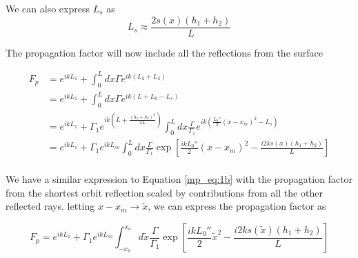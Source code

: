 We can also express $L_s$ as
\begin{equation}
L_s \approx \frac{2s(x)(h_1 + h_2)}{L}
\label{mp_eq:19}
\end{equation}

The propagation factor will now include all the reflections from the surface

\begin{equation}
\begin{aligned}
F_p &= e^{ikL_1} + \int_0^Ldx\Gamma  e^{ik(L_2+L_3)}\\
&= e^{ikL_1} + \int_0^Ldx\Gamma  e^{ik(L+L_0-L_s)}\\
&= e^{ikL_1} +  \Gamma_1e^{ik(L+\frac{(h_1+h_2)^2}{2L})}\int_0^Ldx\frac{\Gamma}{\Gamma_1} e^{ik(\frac{L_0''}{2}(x-x_m)^2-L_s)}\\
&= e^{ikL_1} + \Gamma_1e^{ikL_{so}}\int_0^Ldx\frac{\Gamma}{\Gamma_1} \exp\left[\frac{ikL_0''}{2}(x-x_m)^2 - \frac{i2ks(x)(h_1+h_2)}{L}\right]\\
\end{aligned}
\label{mp_eq:20}
\end{equation}

We have a similar expression to Equation \ref{mp_eq:1b} with the propagation factor from the shortest orbit reflection scaled by contributions from all the other reflected rays. letting $x-x_m \rightarrow \tilde{x}$, we can express the propagation factor as

\begin{equation}
\boxed{F_p = e^{ikL_1} + \Gamma_1 e^{ikL_{so}}\int_{-x_0}^{x_o}d\tilde{x} \frac{\Gamma}{\Gamma_1}\exp\left[\frac{ikL_0''}{2}\tilde{x}^2 - \frac{i2ks(\tilde{x})(h_1+h_2)}{L}\right]}
\label{mp_eq:21}
\end{equation}


